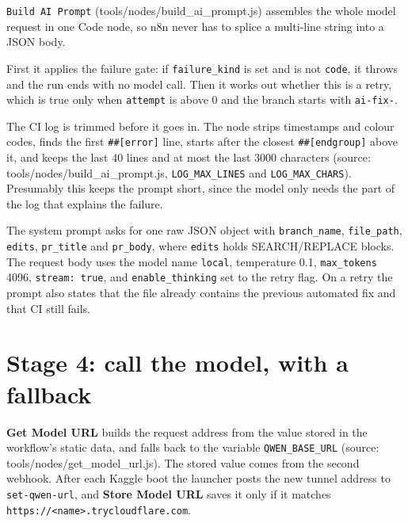 \documentclass[11pt,a4paper]{report}
\begin{document}
\texttt{Build AI Prompt} (tools/nodes/build\_ai\_prompt.js) assembles the whole model request in one Code node, so n8n never has to splice a multi-line string into a JSON body.

First it applies the failure gate: if \texttt{failure\_\allowbreak{}kind} is set and is not \texttt{code}, it throws and the run ends with no model call. Then it works out whether this is a retry, which is true only when \texttt{attempt} is above 0 and the branch starts with \texttt{ai-\allowbreak{}fix-\allowbreak{}}.

The CI log is trimmed before it goes in. The node strips timestamps and colour codes, finds the first \texttt{\#\#[error]} line, starts after the closest \texttt{\#\#[endgroup]} above it, and keeps the last 40 lines and at most the last 3000 characters (source: tools/nodes/build\_ai\_prompt.js, \texttt{LOG\_\allowbreak{}MAX\_\allowbreak{}LINES} and \texttt{LOG\_\allowbreak{}MAX\_\allowbreak{}CHARS}). Presumably this keeps the prompt short, since the model only needs the part of the log that explains the failure.

The system prompt asks for one raw JSON object with \texttt{branch\_\allowbreak{}name}, \texttt{file\_\allowbreak{}path}, \texttt{edits}, \texttt{pr\_\allowbreak{}title} and \texttt{pr\_\allowbreak{}body}, where \texttt{edits} holds SEARCH/REPLACE blocks. The request body uses the model name \texttt{local}, temperature 0.1, \texttt{max\_\allowbreak{}tokens} 4096, \texttt{stream: true}, and \texttt{enable\_\allowbreak{}thinking} set to the retry flag. On a retry the prompt also states that the file already contains the previous automated fix and that CI still fails.

\section{Stage 4: call the model, with a fallback}

\textbf{Get Model URL} builds the request address from the value stored in the workflow's static data, and falls back to the variable \texttt{QWEN\_\allowbreak{}BASE\_\allowbreak{}URL} (source: tools/nodes/get\_model\_url.js). The stored value comes from the second webhook. After each Kaggle boot the launcher posts the new tunnel address to \texttt{set-\allowbreak{}qwen-\allowbreak{}url}, and \textbf{Store Model URL} saves it only if it matches \texttt{https:/\allowbreak{}/\allowbreak{}\textless{}name\textgreater{}.\allowbreak{}trycloudflare.\allowbreak{}com}.
\end{document}
